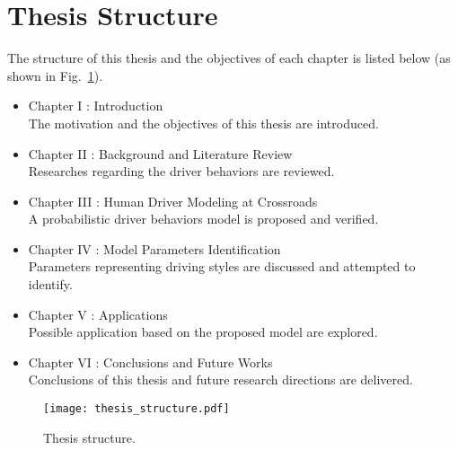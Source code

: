 \section{Thesis Structure}
The structure of this thesis and the objectives of each chapter is listed below (as shown in Fig.~\ref{thesis_struct}).
\begin{itemize}
    \item Chapter I : Introduction\\
        The motivation and the objectives of this thesis are introduced.
    \item Chapter II : Background and Literature Review\\
        Researches regarding the driver behaviors are reviewed.
    \item Chapter III : Human Driver Modeling at Crossroads\\
        A probabilistic driver behaviors model is proposed and verified.
    \item Chapter IV : Model Parameters Identification\\
        Parameters representing driving styles are discussed and attempted to identify.
    \item Chapter V : Applications\\
        Possible application based on the proposed model are explored.
    \item Chapter VI : Conclusions and Future Works\\
        Conclusions of this thesis and future research directions are delivered.
\end{itemize}



\begin{figure}[htbp]
\begin{center}
\texttt{[image: thesis\_structure.pdf]}
\end{center}
\caption{Thesis structure.}
\label{thesis_struct} 
\end{figure}